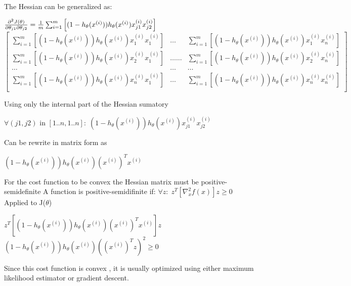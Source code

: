 The Hessian can be generalized as: 
	\begin{center}
	 $\frac{\partial^2 J(\theta)}{\partial\theta_{j1}\partial\theta_{j2}}=\frac{1}{m}\sum_{i=1}^{m}
	\left[
	(1-h_\theta(x^{(i)}))h_\theta(x^{(i)})x_{j1}^{(i)}x_{j2}^{(i)}
	\right]
	$\\[0.2in]
	\[
	\left[ \begin{array}{ccc}
	\sum_{i=1}^{m}	\left[
	(1-h_\theta(x^{(i)}))h_\theta(x^{(i)})x_{1}^{(i)}x_{1}^{(i)}	\right] & \ldots & 
	\sum_{i=1}^{m}	\left[
	 (1-h_\theta(x^{(i)}))h_\theta(x^{(i)})x_{1}^{(i)}x_{n}^{(i)}	\right] \\[0.1in] 
	 \sum_{i=1}^{m}	\left[
	(1-h_\theta(x^{(i)}))h_\theta(x^{(i)})x_{2}^{(i)}x_{1}^{(i)}	\right]  & \ldots
	 \ldots & \sum_{i=1}^{m}	\left[
	(1-h_\theta(x^{(i)}))h_\theta(x^{(i)})x_{2}^{(i)}x_{n}^{(i)}	\right] \\ [0.1in]
	\ldots  & \ldots & \ldots \\ [0.1in]
	\sum_{i=1}^{m}	\left[
	(1-h_\theta(x^{(i)}))h_\theta(x^{(i)})x_{n}^{(i)}x_{1}^{(i)}	\right] & \ldots &
	\sum_{i=1}^{m}	\left[
	(1-h_\theta(x^{(i)}))h_\theta(x^{(i)})x_{n}^{(i)}x_{n}^{(i)}	\right] \\ [0.1in]
	\end{array} \right] 
	\]
	\end{center}
	
	Using only the internal part of the Hessian sumatory
	
	\begin{center}
	$\forall (j1,j2)$ in $[1..n , 1..n] 
	:\; (1-h_\theta(x^{(i)}))h_\theta(x^{(i)})x_{j1}^{(i)}x_{j2}^{(i)} $
	\end{center}
	
	Can be rewrite in matrix form as
	
	\begin{center}
	$(1-h_\theta(x^{(i)}))h_\theta(x^{(i)})(x^{(i)})^Tx^{(i)} $
	\end{center}
	
	For the cost function to be convex the Hessian matrix
	must be positive-semidefinite
	A function is positive-semidifinite if:  $\forall z: \;{z^T}\left[\nabla
	_x^2f(x)\right]z \ge 0$\\ Applied to J($\theta$)
	\begin{center}
	$z^T \left[(1-h_\theta(x^{(i)}))h_\theta(x^{(i)})(x^{(i)})^Tx^{(i)} \right]z$\\
	$(1-h_\theta(x^{(i)}))h_\theta(x^{(i)})\left(( x^{(i)})^Tz\right)^2 \ge 0 $
	\end{center}
	
  Since this cost function is convex \citep{Murphy2012}, it is usually optimized using either 
  maximum likelihood estimator or gradient descent.	
	
